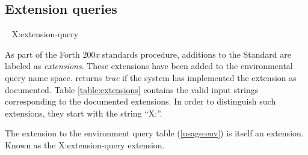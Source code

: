\subsection{Extension queries} %
\label{usage:extensions}
~ \hfill \textsf{\small X:extension-query}

As part of the Forth 200\emph{x} standards procedure, additions to the
Standard are labeled as \emph{extensions}. These extensions have
been added to the environmental query name space. 
returns \emph{true} if the system has implemented the extension as
documented. Table \ref{table:extensions} contains the valid input
strings corresponding to the documented extensions. In order to
distinguish such extensions, they start with the string
``\textsf{X:}''.

The extension to the environment query table (\ref{usage:env}) is
itself an extension. Known as the \textsf{X:extension-query} extension.

